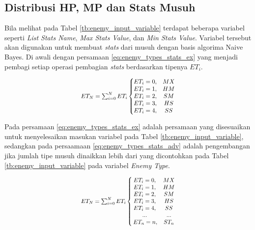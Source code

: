 \subsection{Distribusi HP, MP dan Stats Musuh}
\label{sec:sub_sec3_enemy_hp_mp_stats}
\vspace{1ex}

Bila melihat pada Tabel \ref{tb:enemy_input_variable} terdapat beberapa variabel seperti \textit{List Stats Name}, \textit{Max Stats Value}, dan \textit{Min Stats Value}. Variabel tersebut akan digunakan untuk membuat \textit{stats} dari musuh dengan basis algorima Naive Bayes. Di awali dengan persamaan \ref{eq:enemy_types_stats_ex} yang menjadi pembagi setiap operasi pembagian \textit{stats} berdasarkan tipenya $ET_{i}$.

\begin{equation}\label{eq:enemy_types_stats_ex}
\resizebox{0.4\textwidth}{!}{%
	$ET_{N} = \sum_{i= 0}^{N} ET_{i} \left\{\begin{matrix}
	ET_{i} = 0, & MX\\ 
	ET_{i} = 1, & HM\\ 
	ET_{i} = 2, & SM\\ 
	ET_{i} = 3, & HS\\ 
	ET_{i} = 4, & SS
	\end{matrix}\right.$%
}
\end{equation}

Pada persamaan \ref{eq:enemy_types_stats_ex} adalah persamaan yang disesuaikan untuk menyelesaikan masukan variabel pada Tabel \ref{tb:enemy_input_variable}, sedangkan pada persaamaan \ref{eq:enemy_types_stats_adv} adalah pengembangan jika jumlah tipe musuh dinaikkan lebih dari yang dicontohkan pada Tabel \ref{tb:enemy_input_variable} pada variabel \textit{Enemy Type}.
\vspace{1ex}

\begin{equation}\label{eq:enemy_types_stats_adv}
\resizebox{0.4\textwidth}{!}{%
	$ET_{N} = \sum_{i= 0}^{N} ET_{i} \left\{\begin{matrix}
	ET_{i} = 0, & MX\\ 
	ET_{i} = 1, & HM\\ 
	ET_{i} = 2, & SM\\ 
	ET_{i} = 3, & HS\\ 
	ET_{i} = 4, & SS\\
	... & ... \\
	\hspace{0.2em} ET_{n} = n, & ST_{n}
	\end{matrix}\right.$%
}
\end{equation}

